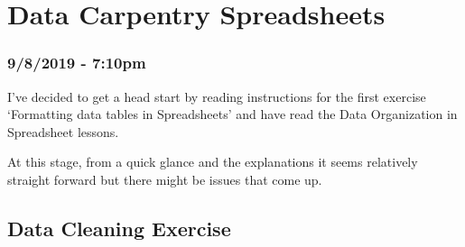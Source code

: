 \documentclass{article}
\begin{document}
\par


\newpage
\section{Data Carpentry Spreadsheets}
\subsubsection*{9/8/2019 - 7:10pm}
I’ve decided to get a head start by reading instructions for the first exercise ‘Formatting data tables in Spreadsheets’ and have read the Data Organization in Spreadsheet lessons.\par
At this stage, from a quick glance and the explanations it seems relatively straight forward but there might be issues that come up.\par
\subsection{Data Cleaning Exercise}
\end{document}
